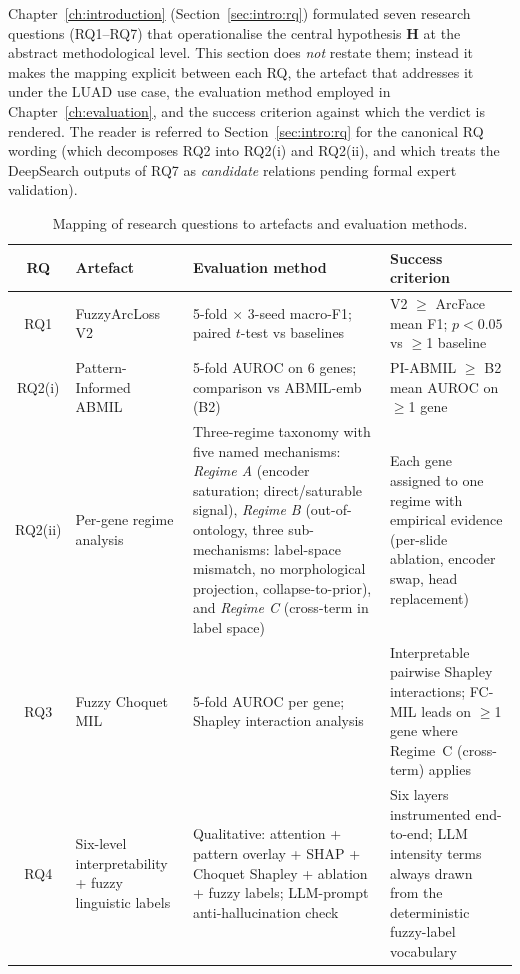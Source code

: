 Chapter~\ref{ch:introduction} (Section~\ref{sec:intro:rq}) formulated
seven research questions (RQ1--RQ7) that operationalise the central
hypothesis $\mathbf{H}$ at the abstract methodological level.
This section does \emph{not} restate them; instead it makes the
mapping explicit between each RQ, the artefact that addresses it under
the LUAD use case, the evaluation method employed in
Chapter~\ref{ch:evaluation}, and the success criterion against which
the verdict is rendered.
The reader is referred to Section~\ref{sec:intro:rq} for the canonical
RQ wording (which decomposes RQ2 into RQ2(i) and RQ2(ii), and which
treats the DeepSearch outputs of RQ7 as \emph{candidate} relations
pending formal expert validation).

\begin{table}[ht!]
\centering
\small
\caption{Mapping of research questions to artefacts and evaluation
methods.}
\label{tab:rq_mapping}
\begin{tabular}{c p{3.8cm} p{3.5cm} p{3.5cm}}
\hline
\textbf{RQ} & \textbf{Artefact} & \textbf{Evaluation method} &
\textbf{Success criterion} \\
\hline
RQ1 & FuzzyArcLoss V2 & 5-fold $\times$ 3-seed macro-F1; paired
$t$-test vs baselines & V2 $\geq$ ArcFace mean F1; $p < 0.05$ vs
$\geq$1 baseline \\
RQ2(i) & Pattern-Informed ABMIL & 5-fold AUROC on 6 genes; comparison vs
ABMIL-emb (B2) & PI-ABMIL $\geq$ B2 mean AUROC on $\geq$1 gene \\
RQ2(ii) & Per-gene regime analysis & Three-regime taxonomy with
five named mechanisms: \emph{Regime A} (encoder saturation;
direct/saturable signal), \emph{Regime B} (out-of-ontology, three
sub-mechanisms: label-space mismatch, no morphological projection,
collapse-to-prior), and \emph{Regime C} (cross-term in label space) &
Each gene assigned to one regime with empirical evidence
(per-slide ablation, encoder swap, head replacement) \\
RQ3 & Fuzzy Choquet MIL & 5-fold AUROC per gene; Shapley
interaction analysis & Interpretable pairwise Shapley interactions;
FC-MIL leads on $\geq$1 gene where Regime~C (cross-term) applies \\
RQ4 & Six-level interpretability + fuzzy linguistic labels &
Qualitative: attention + pattern overlay + SHAP + Choquet Shapley +
ablation + fuzzy labels; LLM-prompt anti-hallucination check &
Six layers instrumented end-to-end; LLM intensity terms always drawn
from the deterministic fuzzy-label vocabulary \\

\end{tabular}
\end{table}
